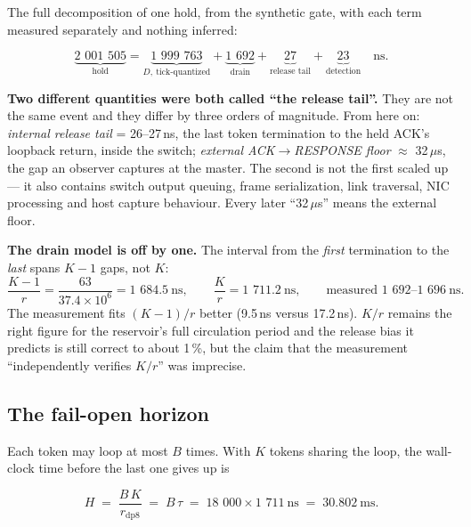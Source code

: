 \documentclass[10pt,a4paper,oneside]{article}
\newenvironment{keybox}{\begin{snugshade}\noindent\ignorespaces}{\end{snugshade}}
\newcommand{\num}[1]{\mbox{#1}}
\begin{document}
The full decomposition of one hold, from the synthetic gate, with each term measured
separately and nothing inferred:

\begin{equation}
\underbrace{\num{2 001 505}}_{\text{hold}}
=
\underbrace{\num{1 999 763}}_{D,\ \text{tick-quantized}}
+
\underbrace{\num{1 692}}_{\text{drain}}
+
\underbrace{27}_{\text{release tail}}
+
\underbrace{23}_{\text{detection}}
\quad \text{ns.}
\label{eq:decomp}
\end{equation}

\begin{keybox}
\textbf{Two different quantities were both called ``the release tail''.} They are
not the same event and they differ by three orders of magnitude. From here on:
\emph{internal release tail} = 26--27\,ns, the last token termination to the held ACK's
loopback return, inside the switch; \emph{external ACK$\rightarrow$RESPONSE floor}
$\approx$ 32\,$\mu$s, the gap an observer captures at the master. The second is not the
first scaled up --- it also contains switch output queuing, frame serialization, link
traversal, NIC processing and host capture behaviour. Every later ``32\,$\mu$s'' means the
external floor.
\end{keybox}

\textbf{The drain model is off by one.} The interval from the \emph{first}
termination to the \emph{last} spans $K-1$ gaps, not $K$:
\[
\frac{K-1}{r} = \frac{63}{37.4\times10^{6}} = \num{1 684.5}\ \mathrm{ns},
\qquad
\frac{K}{r} = \num{1 711.2}\ \mathrm{ns},
\qquad
\text{measured } \num{1 692}\text{--}\num{1 696}\ \mathrm{ns}.
\]
The measurement fits $(K-1)/r$ better (9.5\,ns versus 17.2\,ns). $K/r$ remains the right
figure for the reservoir's full circulation period and the release bias it predicts is still
correct to about 1\,\%, but the claim that the measurement ``independently verifies $K/r$''
was imprecise.

\subsection{The fail-open horizon}

Each token may loop at most $B$ times. With $K$ tokens sharing the loop, the wall-clock
time before the last one gives up is

\begin{equation}
H \;=\; \frac{B\,K}{r_{\mathrm{dp8}}} \;=\; B\,\tau
  \;=\; \num{18 000}\times\num{1 711}\ \mathrm{ns} \;=\; \num{30.802}\ \mathrm{ms}.
\label{eq:horizon}
\end{equation}
\end{document}
